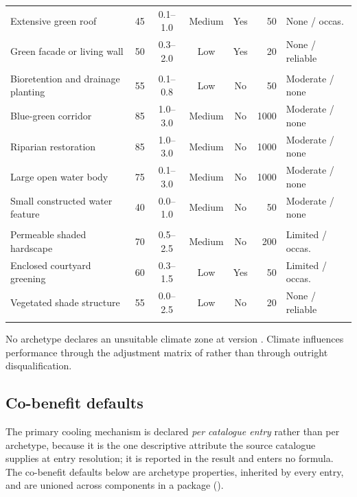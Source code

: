 {\begin{longtable}{@{}lrcccrl@{}}
Extensive green roof & 45 & 0.1--1.0 & Medium & Yes & 50 & None / occas. \\
Green facade or living wall & 50 & 0.3--2.0 & Low & Yes & 20 & None / reliable \\
\addlinespace
\multicolumn{7}{@{}l}{\textit{Blue-green}}\\
Bioretention and drainage planting & 55 & 0.1--0.8 & Low & No & 50 & Moderate / none \\
Blue-green corridor & 85 & 1.0--3.0 & Medium & No & 1000 & Moderate / none \\
Riparian restoration & 85 & 1.0--3.0 & Medium & No & 1000 & Moderate / none \\
Large open water body & 75 & 0.1--3.0 & Medium & No & 1000 & Moderate / none \\
Small constructed water feature & 40 & 0.0--1.0 & Medium & No & 50 & Moderate / none \\
\addlinespace
\multicolumn{7}{@{}l}{\textit{Hybrid}}\\
Permeable shaded hardscape & 70 & 0.5--2.5 & Medium & No & 200 & Limited / occas. \\
Enclosed courtyard greening & 60 & 0.3--1.5 & Low & Yes & 50 & Limited / occas. \\
Vegetated shade structure & 55 & 0.0--2.5 & Low & No & 20 & None / reliable \\
\addlinespace
\end{longtable}
}

No archetype declares an unsuitable climate zone at version \methver{}. Climate
influences performance through the adjustment matrix of
 rather than through outright disqualification.

\subsection{Co-benefit defaults}

The primary cooling mechanism is declared \emph{per catalogue entry} rather
than per archetype, because it is the one descriptive attribute the source
catalogue supplies at entry resolution; it is reported in the result and enters
no formula. The co-benefit defaults below are archetype properties, inherited
by every entry, and are unioned across components in a package
().

